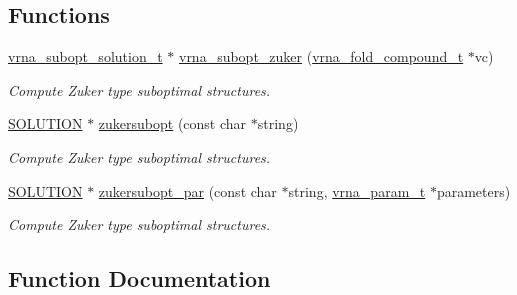 \subsection*{Functions}
\begin{DoxyCompactItemize}
\item 
\hyperlink{subopt_8h_a01ae9a0f27d245d89f705afd843fc457}{vrna\+\_\+subopt\+\_\+solution\+\_\+t} $\ast$ \hyperlink{group__subopt__zuker_gababde9d210eb433854f1e71da7815fbb}{vrna\+\_\+subopt\+\_\+zuker} (\hyperlink{group__fold__compound_ga1b0cef17fd40466cef5968eaeeff6166}{vrna\+\_\+fold\+\_\+compound\+\_\+t} $\ast$vc)
\begin{DoxyCompactList}\small\item\em Compute Zuker type suboptimal structures. \end{DoxyCompactList}\item 
\hyperlink{subopt_8h_aa0f46ff02e1017469cf902d02ecd7f9a}{S\+O\+L\+U\+T\+I\+ON} $\ast$ \hyperlink{group__subopt__zuker_ga0d5104e3ecf119d8eabd40aa5fe47f90}{zukersubopt} (const char $\ast$string)
\begin{DoxyCompactList}\small\item\em Compute Zuker type suboptimal structures. \end{DoxyCompactList}\item 
\hyperlink{subopt_8h_aa0f46ff02e1017469cf902d02ecd7f9a}{S\+O\+L\+U\+T\+I\+ON} $\ast$ \hyperlink{group__subopt__zuker_gab6d0ea8cc1d02f6dd831ca81043c9eb8}{zukersubopt\+\_\+par} (const char $\ast$string, \hyperlink{group__energy__parameters_ga8a69ca7d787e4fd6079914f5343a1f35}{vrna\+\_\+param\+\_\+t} $\ast$parameters)
\begin{DoxyCompactList}\small\item\em Compute Zuker type suboptimal structures. \end{DoxyCompactList}\end{DoxyCompactItemize}


\subsection{Function Documentation}
\mbox{\label{group__subopt__zuker_gababde9d210eb433854f1e71da7815fbb}} 
